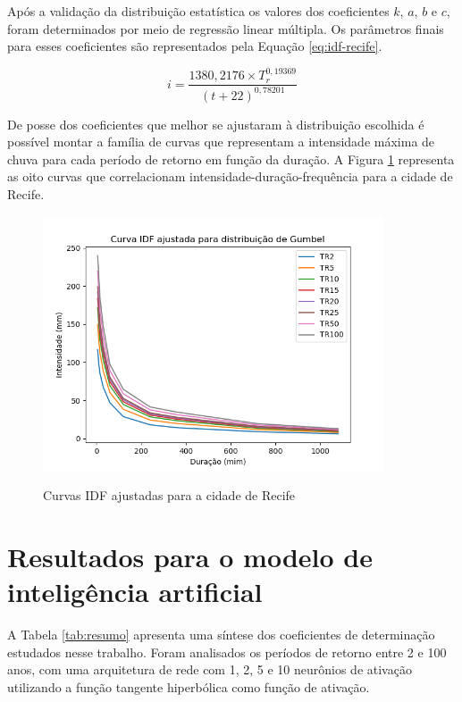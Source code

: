 Após a validação da distribuição estatística os valores dos coeficientes $k$, $a$, $b$ e $c$, foram determinados por meio de regressão linear múltipla. Os parâmetros finais para esses coeficientes são representados pela Equação \ref{eq:idf-recife}.

\begin{equation}
    i = \frac{1380,2176\times T_r^{0,19369}}{(t+22)^{0,78201}}
\label{eq:idf-recife}
\end{equation}

De posse dos coeficientes que melhor se ajustaram à distribuição escolhida é possível montar a família de curvas que representam a intensidade máxima de chuva para cada período de retorno em função da duração. A Figura \ref{fig:idf-ajustada} representa as oito curvas que correlacionam intensidade-duração-frequência para a cidade de Recife.

\begin{figure}[h]
    \caption{Curvas IDF ajustadas para a cidade de Recife}
    \centering
    \includegraphics[width=0.9\textwidth]{Textuais/Figuras/curvas-idf-ajustadas.png}
    \label{fig:idf-ajustada}
\end{figure}

\section{Resultados para o modelo de inteligência artificial}

A Tabela \ref{tab:resumo} apresenta uma síntese dos coeficientes de determinação estudados nesse trabalho. Foram analisados os períodos de retorno entre 2 e 100 anos, com uma arquitetura de rede com 1, 2, 5 e 10 neurônios de ativação utilizando a função tangente hiperbólica como função de ativação.

